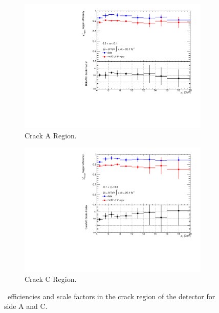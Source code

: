 \begin{figure}[htbp]
  \centering
    \begin{subfigure}[b]{0.85\textwidth}
        \includegraphics[width=\textwidth]{PartCalibration2012/Plots/SFPlots/Crack_A_smt.pdf}
        \caption{Crack A Region.}
      \label{fig:CalibrationScaleFactorCrackA}
    \end{subfigure}
  
    \begin{subfigure}[b]{0.85\textwidth}
        \includegraphics[width=\textwidth]{PartCalibration2012/Plots/SFPlots/Crack_C_smt.pdf}
        \caption{Crack C Region.}
      \label{fig:CalibrationScaleFactorCrackC}
    \end{subfigure}
    \caption[\xsm\ efficiencies and scale factors in the crack region of the detector for side A and C.]{\xsm\ efficiencies and scale factors in the crack region of the detector for side  A and  C.}
  \label{fig:CalibrationScaleFactorCrack}
\end{figure}

